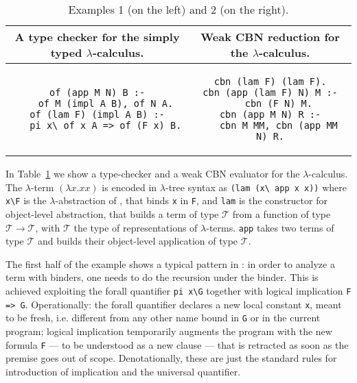 \documentclass{llncs}
\begin{document}
\begin{table}
\begin{center}
\begin{tabular}{c@{~~}|@{~~}c}
A type checker for the simply typed $\lambda$-calculus. &
Weak CBN reduction for the $\lambda$-calculus.\\\hline
\begin{minipage}{5.0cm}
\begin{verbatim}
of (app M N) B :-
   of M (impl A B), of N A.
of (lam F) (impl A B) :-
   pi x\ of x A => of (F x) B.

\end{verbatim}
\end{minipage}
&
\begin{minipage}{5.0cm}
\begin{verbatim}
cbn (lam F) (lam F).
cbn (app (lam F) N) M :-
   cbn (F N) M.
cbn (app M N) R :-
   cbn M MM, cbn (app MM N) R.
\end{verbatim}
\end{minipage}
\end{tabular}
\end{center}
\caption{\label{example1} Examples 1 (on the left) and 2 (on the right).}
\end{table}
In Table~\ref{example1} we show a type-checker and a weak CBN evaluator for the
$\lambda$-calculus. The $\lambda$-term $(\lambda x.xx)$ is encoded in
$\lambda$-tree syntax as \verb+(lam (x\ app x x))+ where \verb+x\F+ is
the $\lambda$-abstraction of \lp{}, that binds \verb+x+ in \verb+F+, and
\verb+lam+ is the constructor for object-level abstraction, that builds
a term of type $\mathcal{T}$ from a function of type
$\mathcal{T} \to \mathcal{T}$, with $\mathcal{T}$ the type of representations
of $\lambda$-terms. \verb+app+ takes two terms of type $\mathcal{T}$ and builds
their object-level application of type $\mathcal{T}$.

The first half of the example shows a typical pattern in \lp: in order to analyze a term with binders, one needs to do the recursion under the binder. This is achieved exploiting the forall quantifier \verb+pi x\G+ together with logical
implication \verb+F => G+. Operationally: the forall quantifier declares a new local constant \verb+x+, meant to be fresh, i.e. different from any other name bound in \verb+G+ or in the current program; logical implication temporarily augments the program with the new formula \verb+F+ --- to be understood as a new clause --- that is retracted as soon as the premise goes out of scope. Denotationally, these are just the standard rules for introduction of implication and the universal quantifier.
\end{document}
